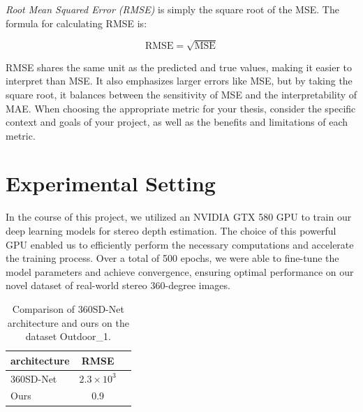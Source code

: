 \documentclass[english, LaM, oneside]{sapthesis}%
\begin{document}
\textit{Root Mean Squared Error (RMSE)} is simply the square root of the MSE. The formula for calculating RMSE is:

\begin{equation}
\text{RMSE} = \sqrt{\text{MSE}}
\end{equation}

RMSE shares the same unit as the predicted and true values, making it easier to interpret than MSE. It also emphasizes larger errors like MSE, but by taking the square root, it balances between the sensitivity of MSE and the interpretability of MAE. When choosing the appropriate metric for your thesis, consider the specific context and goals of your project, as well as the benefits and limitations of each metric.

\section{Experimental Setting}
In the course of this project, we utilized an NVIDIA GTX 580 GPU to train our deep learning models for stereo depth estimation. The choice of this powerful GPU enabled us to efficiently perform the necessary computations and accelerate the training process. Over a total of 500 epochs, we were able to fine-tune the model parameters and achieve convergence, ensuring optimal performance on our novel dataset of real-world stereo 360-degree images. 




\begin{table}[h]
\centering
\caption{Comparison of 360SD-Net architecture and ours on the dataset Outdoor\_1.  }
\label{table:sample}
\begin{tabular}{|l | c | r} %
\toprule
\textbf{architecture}  & \textbf{RMSE} \\
\midrule
360SD-Net &  $2.3 \times 10^3$ \\
Ours & 0.9 \\
\bottomrule
\end{tabular}
\end{table}
\end{document}
